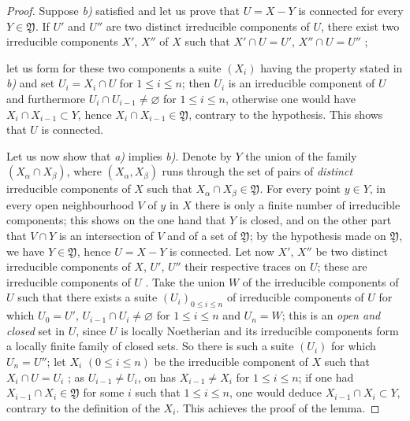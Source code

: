 \begin{proof}
Suppose \emph{b)} satisfied and let us prove that $U=X-Y$ is connected for every $Y\in\mathfrak{Y}$.
If $U'$ and $U''$ are two distinct irreducible components of $U$, there exist two irreducible components $X'$, $X''$ of $X$ such that $X'\cap U=U'$, $X''\cap U=U''$ ;


let us form for these two components a suite $(X_i)$ having the property stated in \emph{b)} and set $U_i=X_i\cap U$ for $1\leqslant i\leqslant n$; then $U_i$ is an irreducible component of $U$  and furthermore $U_i\cap U_{i-1}\neq\varnothing$ for $1\leqslant i\leqslant n$, otherwise one would have $X_i\cap X_{i-1}\subset Y$, hence $X_i\cap X_{i-1}\in\mathfrak{Y}$, contrary to the hypothesis.
This shows that $U$ is connected.

Let us now show that \emph{a)} implies \emph{b)}.
Denote by $Y$ the union of the family $(X_\alpha\cap X_\beta)$, where $(X_\alpha,X_\beta)$ runs through the set of pairs of \emph{distinct} irreducible components of $X$ such that $X_\alpha\cap X_\beta\in\mathfrak{Y}$.
For every point $y\in Y$, in every open neighbourhood $V$ of $y$ in $X$ there is only a finite number of irreducible components; this shows on the one hand that $Y$ is closed, and on the other part that $V\cap Y$ is an intersection of $V$ and of a set of $\mathfrak{Y}$; by the hypothesis made on $\mathfrak{Y}$, we have $Y\in\mathfrak{Y}$, hence $U=X-Y$ is connected.
Let now $X'$, $X''$ be two distinct irreducible components of $X$, $U'$, $U''$ their respective traces on $U$; these are irreducible components of $U$ .
Take the union $W$ of the irreducible components of $U$ such that there exists a suite $(U_i)_{0\leqslant i\leqslant n}$ of irreducible components of $U$ for which $U_0=U'$, $U_{i-1}\cap U_i\neq\varnothing$ for $1\leqslant i\leqslant n$ and $U_n=W$; this is an \emph{open and closed} set in $U$, since $U$ is locally Noetherian and its irreducible components form a locally finite family of closed sets.
So there is such a suite $(U_i)$ for which $U_n=U''$; let $X_i$ $(0\leqslant i\leqslant n)$ be the irreducible component of $X$ such that $X_i\cap U=U_i$ ; as $U_{i-1}\neq U_i$, on has $X_{i-1}\neq X_i$ for $1\leqslant i\leqslant n$; if one had $X_{i-1}\cap X_i\in\mathfrak{Y}$ for some $i$ such that $1\leqslant i\leqslant n$, one would deduce $X_{i-1}\cap X_i\subset Y$, contrary to the definition of the $X_i$.
This achieves the proof of the lemma.
\end{proof}

